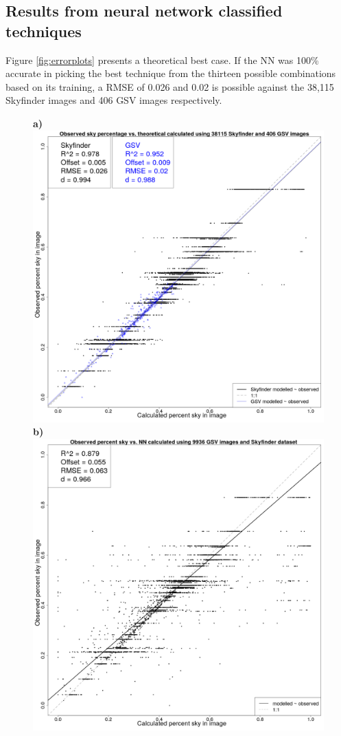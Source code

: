\documentclass[final,3p,times,authoryear]{elsarticle}
\begin{document}
\subsection{Results from neural network classified techniques}\label{sec:resultsnn}
Figure \ref{fig:errorplots} presents a theoretical best case. If the NN was 100\% accurate in picking the best technique from the thirteen possible combinations based on its training, a RMSE of 0.026 and 0.02 is possible against the 38,115 Skyfinder images and 406 GSV images respectively. 

\begin{figure}
\centering
\textbf{a)}\includegraphics[scale=0.15]{Images/ErrorPlots1Combined.png}
\textbf{b)}\includegraphics[scale=0.15]{Images/ErrorPlotsCNTK.png}

\end{figure}
\end{document}
